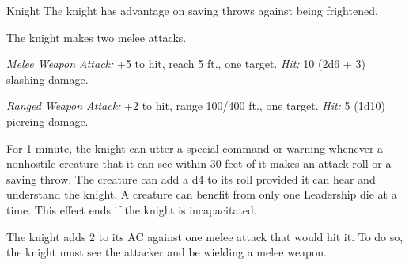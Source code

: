 \documentclass[10pt,a4paper,twoside,twocolumn,openany,nodeprecatedcode]{dndbook}
\begin{document}
\begin{DndMonster}[float=ht]{Knight}
\DndMonsterBasics[
armor-class = {18 (plate armor)},
hit-points = {\DndDice{8d8 + 16}},
speed = {30 ft.}
]
\DndMonsterAbilityScores[
 str = 16,
 dex = 11,
 con = 14,
 int = 11,
 wis = 11,
 cha = 15
]
\DndMonsterDetails[
saving-throws = {Con +4, Wis +2},
languages = {any one language (usually Common)},
challenge = 3,
]
The knight has advantage on saving throws against being frightened.

\par
{}
The knight makes two melee attacks.

\textsl{Melee Weapon Attack:} +5 to hit, reach 5 ft., one target. \textsl{Hit:} 10 (2d6 + 3) slashing damage.

\textsl{Ranged Weapon Attack:} +2 to hit, range 100/400 ft., one target. \textsl{Hit:} 5 (1d10) piercing damage.

For 1 minute, the knight can utter a special command or warning whenever a nonhostile creature that it can see within 30 feet of it makes an attack roll or a saving throw. The creature can add a d4 to its roll provided it can hear and understand the knight. A creature can benefit from only one Leadership die at a time. This effect ends if the knight is incapacitated.

\par
{}
The knight adds 2 to its AC against one melee attack that would hit it. To do so, the knight must see the attacker and be wielding a melee weapon.

\end{DndMonster}


\clearpage
{}
\end{document}

